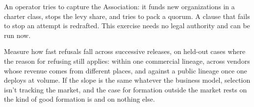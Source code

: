 
An operator tries to capture the Association: it funds new organizations in a charter class, stops the levy share, and tries to pack a quorum. A clause that fails to stop an attempt is redrafted. This exercise needs no legal authority and can be run now.


Measure how fast refusals fall across successive releases, on held-out cases where the reason for refusing still applies: within one commercial lineage, across vendors whose revenue comes from different places, and against a public lineage once one deploys at volume. If the slope is the same whatever the business model, selection isn't tracking the market, and the case for formation outside the market rests on the kind of good formation is and on nothing else.
